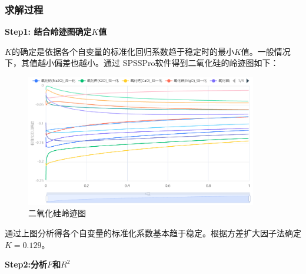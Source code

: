 \documentclass[UTF8]{ctexart}
\begin{document}
\subsubsection{求解过程}
\textbf{Step1: 结合岭迹图确定$K$值}

$K$的确定是依据各个自变量的标准化回归系数趋于稳定时的最小$K$值。一般情况下，其值越小偏差也越小。通过
SPSSPro软件得到二氧化硅的岭迹图如下：
\begin{figure}[H]\centering
	\includegraphics[width=0.9\textwidth]{img/二氧化硅岭迹图.png} %
	\caption{二氧化硅岭迹图} %
	\label{fig:figure 5} %
\end{figure}

通过上图分析得各个自变量的标准化系数基本趋于稳定。根据方差扩大因子法确定$K=0.129$。	

\textbf{Step2:分析$F$和$R^2$}
\end{document}
